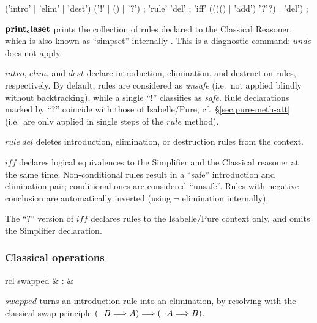 \begin{rail}
  ('intro' | 'elim' | 'dest') ('!' | () | '?')
  ;
  'rule' 'del'
  ;
  'iff' (((() | 'add') '?'?) | 'del')
  ;
\end{rail}

\begin{descr}

\item [${\mathord{\mathbf{print_claset}}}$] prints the collection of rules declared to
  the Classical Reasoner, which is also known as ``simpset'' internally
  \cite{isabelle-ref}.  This is a diagnostic command; $undo$ does not apply.

\item [$intro$, $elim$, and $dest$] declare introduction, elimination, and
  destruction rules, respectively.  By default, rules are considered as
  \emph{unsafe} (i.e.\ not applied blindly without backtracking), while a
  single ``!'' classifies as \emph{safe}.  Rule declarations marked by ``?''
  coincide with those of Isabelle/Pure, cf.\ \S\ref{sec:pure-meth-att} (i.e.\
  are only applied in single steps of the $rule$ method).

\item [$rule~del$] deletes introduction, elimination, or destruction rules from
  the context.

\item [$iff$] declares logical equivalences to the Simplifier and the
  Classical reasoner at the same time.  Non-conditional rules result in a
  ``safe'' introduction and elimination pair; conditional ones are considered
  ``unsafe''.  Rules with negative conclusion are automatically inverted
  (using $\neg$ elimination internally).

  The ``?'' version of $iff$ declares rules to the Isabelle/Pure context only,
  and omits the Simplifier declaration.

\end{descr}


\subsubsection{Classical operations}


\begin{matharray}{rcl}
  swapped & : & \isaratt \\
\end{matharray}

\begin{descr}

\item [$swapped$] turns an introduction rule into an elimination, by resolving
  with the classical swap principle $(\neg B \Longrightarrow A) \Longrightarrow (\neg A \Longrightarrow B)$.

\end{descr}


